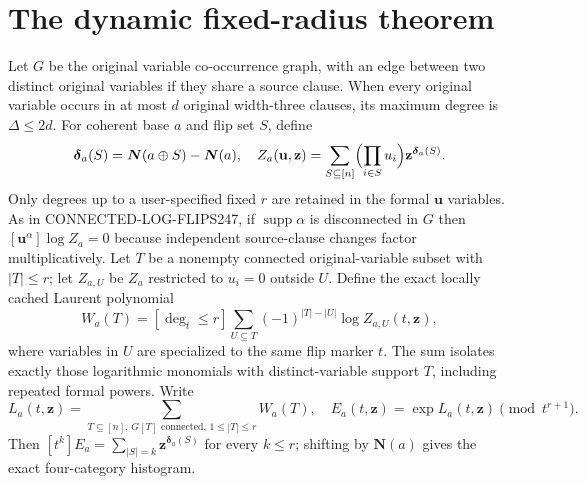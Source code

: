 \documentclass[11pt]{article}
\newcommand{\vN}{\boldsymbol{N}}
\newcommand{\bdelta}{\boldsymbol{\delta}}
\begin{document}
\section{The dynamic fixed-radius theorem}
Let $G$ be the original variable co-occurrence graph, with an edge between two distinct original variables if they share a source clause. When every original variable occurs in at most $d$ original width-three clauses, its maximum degree is $\Delta\le2d$. For coherent base $a$ and flip set $S$, define
\[
 \bdelta_a(S)=\vN(a\oplus S)-\vN(a),\quad
 Z_a(\mathbf u,\mathbf z)=\sum_{S\subseteq[n]}\Bigl(\prod_{i\in S}u_i\Bigr)\mathbf z^{\bdelta_a(S)}.
\]
Only degrees up to a user-specified fixed $r$ are retained in the formal $\mathbf u$ variables. As in CONNECTED-LOG-FLIPS247, if $\operatorname{supp}\alpha$ is disconnected in $G$ then $[\mathbf u^\alpha]\log Z_a=0$ because independent source-clause changes factor multiplicatively. Let $T$ be a nonempty connected original-variable subset with $|T|\le r$; let $Z_{a,U}$ be $Z_a$ restricted to $u_i=0$ outside $U$. Define the exact locally cached Laurent polynomial
\[
 W_a(T)=[\deg_t\le r]\sum_{U\subseteq T}(-1)^{|T|-|U|}\log Z_{a,U}(t,\mathbf z),
\]
where variables in $U$ are specialized to the same flip marker $t$. The sum isolates exactly those logarithmic monomials with distinct-variable support $T$, including repeated formal powers. Write
\[
 L_a(t,\mathbf z)=\sum_{T\subseteq[n],\,G[T]\text{ connected},\,1\le|T|\le r}W_a(T),\quad
 E_a(t,\mathbf z)=\exp L_a(t,\mathbf z)\pmod{t^{r+1}}.
\]
Then $[t^k]E_a=\sum_{|S|=k}\mathbf z^{\bdelta_a(S)}$ for every $k\le r$; shifting by $\vN(a)$ gives the exact four-category histogram.
\end{document}
